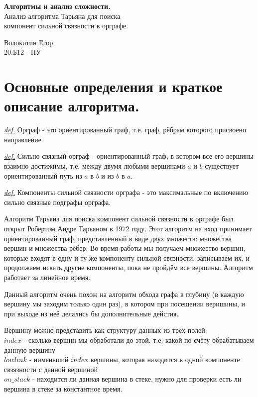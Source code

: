 \documentclass[oneside,final,14pt]{extreport}
\begin{document}
\begin{titlepage}
\begin{center}
    {\bfseries Алгоритмы и анализ сложности.} \\
    \vspace{\fill}
    Анализ алгоритма Тарьяна для поиска \\ компонент сильной связности 
    в орграфе.
\end{center}
\vspace{\fill}
    \begin{flushright}
        Волокитин Егор \\ 20.Б12 - ПУ
    \end{flushright}
\end{titlepage}

\newpage

\tableofcontents

\newpage
\section{Основные определения и краткое описание алгоритма.}

\noindent
{\itshape \underline{def.}} Орграф - это ориентированный граф, т.е. граф,
рёбрам которого присвоено направление.

\noindent
{\itshape \underline{def.}} Сильно связный орграф - ориентированный граф,
в котором все его вершины взаимно достижимы, т.е. между двумя любыми
вершинами $a$ и $b$ существует ориентированный путь из $a$ в $b$ и из $b$ в
$a$.

\noindent
{\itshape \underline{def.}} Компоненты сильной связности орграфа - это
максимальные по включению сильно связные подграфы орграфа.

\bigskip
\noindent
Алгоритм Тарьяна для поиска компонент сильной связности в орграфе был
открыт Робертом Андре Тарьяном в 1972 году. Этот алгоритм на вход принимает
ориентированный граф, представленный в виде двух множеств: множества вершин
и множества рёбер. Во время работы мы получаем множество вершин, которые 
входят в одну и ту же компоненту сильной связности, записываем их,
и продолжаем искать другие компоненты, пока не пройдём все вершины.
Алгоритм работает за линейное время.


\bigskip
\noindent
Данный алгоритм очень похож на алгоритм обхода графа в глубину (в каждую 
вершину мы заходим только один раз), в котором
при посещении веришины, и при выходе из неё делались бы дополнительные 
дейстия.

\bigskip
\noindent
Вершину можно представить как структуру данных из трёх полей: \\
\indent $index$ - сколько вершин мы обработали до этой, т.е. какой по 
счёту обрабатываем данную вершину \\
\indent $lowlink$ - нименьший $index$ вершины, которая находится
в одной компоненте свзязности с данной вершиной \\
\indent $on\_stack$ - находится ли данная вершина в стеке, нужно для
проверки есть ли вершина в стеке за константное время.
\end{document}
